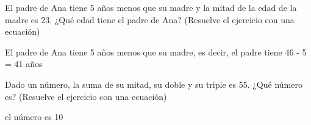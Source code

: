 \documentclass[addpoints,spanish, 12pt,a4paper]{exam}
\begin{document}
\begin{questions}


\question[2] El padre de Ana tiene 5 años menos que su madre y la mitad de la edad de la madre es 23. ¿Qué edad tiene el padre de Ana? (Resuelve el ejercicio con una ecuación)
\begin{solution} El padre de Ana tiene 5 años menos que su madre, es decir, el padre tiene 46 - 5 = 41 años\end{solution}

\question[2] Dado un número, la suma de su mitad, su doble y su triple es 55. ¿Qué número es? (Resuelve el ejercicio con una ecuación)
\begin{solution} el número es 10\end{solution}




\addpoints

\end{questions}
\end{document}
